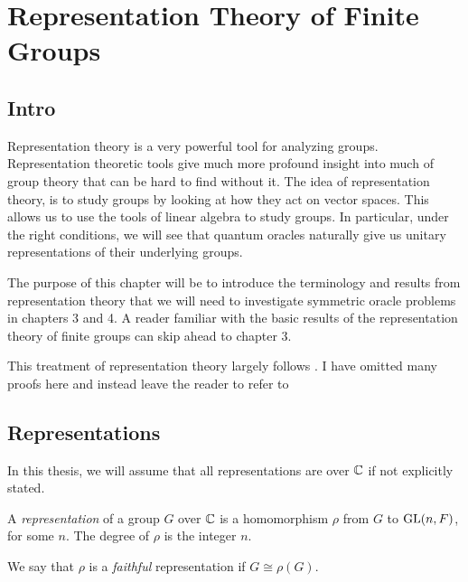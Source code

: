 
\chapter{Representation Theory of Finite Groups}

\section{Intro}


Representation theory is a very powerful tool for analyzing groups. Representation theoretic tools give much more 
profound insight into much of group theory that can be hard to find without it. The idea of representation theory, 
is to study groups by looking at how they act on vector spaces. This allows us to use the tools of linear algebra 
to study groups. In particular, under the right conditions, we will see that quantum oracles naturally give us 
unitary representations of their underlying groups.

The purpose of this chapter will be to introduce the terminology and results from representation theory that we 
will need to investigate symmetric oracle problems in chapters 3 and 4. A reader familiar with the basic results of 
the representation theory of finite groups can skip ahead to chapter 3. 

This treatment of representation theory largely follows \cite{James&Liebeck}. I have omitted many proofs here and 
instead leave the reader to refer to \cite{James&Liebeck}

\section{Representations}

In this thesis, we will assume that all representations are over $\mathbb{C} $ if not explicitly stated.

\begin{definition}
    A \emph{representation} of a group $G$ over $\mathbb{C}$ is a homomorphism $\rho$ from $G$ to $\operatorname{GL}(n,F)$, for some $n$. 
    The degree of $\rho$ is the integer $n$.

    We say that $\rho$ is a \emph{faithful} representation if $G \cong \rho(G)$.
\end{definition}

